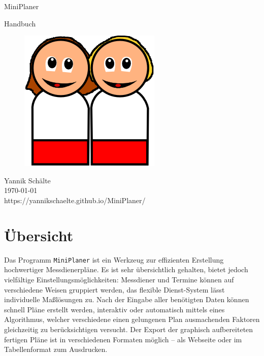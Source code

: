 \documentclass[a4paper,11pt]{article}
\date{\today}
\author{Yannik Schälte}
\begin{document}
\thispagestyle{empty}
\begin{center}
\vspace*{3cm}
{\Huge MiniPlaner}\\
\makebox[\linewidth]{\color{red}\rule{17.5cm}{1pt}}

\vspace*{1cm}
{\Large Handbuch}\\
\vspace*{2cm}
\begin{figure}[ht]
	\centering
  		\includegraphics[scale=3.0]{../img/minis256.png}
	\label{fig1}
\end{figure}
\vspace*{4cm}
Yannik Schälte\\
\vspace*{5mm}
\today\\
\vspace*{5mm}
https://yannikschaelte.github.io/MiniPlaner/
\end{center}
\pagebreak


\tableofcontents
\thispagestyle{empty}


\section*{Übersicht}
Das Programm \texttt{MiniPlaner} ist ein Werkzeug zur effizienten Erstellung hochwertiger Messdienerpläne. Es ist sehr übersichtlich gehalten, bietet jedoch vielfältige Einstellungsmöglichkeiten: Messdiener und Termine können auf verschiedene Weisen gruppiert werden, das flexible Dienst-System lässt individuelle Maßlösungen zu. Nach der Eingabe aller benötigten Daten können schnell Pläne erstellt werden, interaktiv oder automatisch mittels eines Algorithmus, welcher verschiedene einen gelungenen Plan ausmachenden Faktoren gleichzeitig zu berücksichtigen versucht. Der Export der graphisch aufbereiteten fertigen Pläne ist in verschiedenen Formaten möglich -- als Webseite oder im Tabellenformat zum Ausdrucken.
\end{document}
